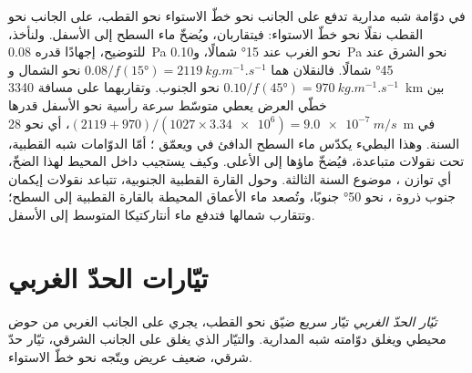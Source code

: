 في دوّامة شبه مدارية تدفع  على الجانب نحو خطّ الاستواء  نحو القطب،  على الجانب نحو القطب نقلًا نحو خطّ الاستواء: فيتقاربان، ويُضخّ ماء السطح إلى الأسفل. ولنأخذ، للتوضيح، إجهادًا قدره \qty{0.08}{Pa} نحو الغرب عند \ang{15} شمالًا، و\qty{0.10}{Pa} نحو الشرق عند \ang{45} شمالًا. فالنقلان هما $0.08/f(\ang{15}) = \qty{2119}{kg.m^{-1}.s^{-1}}$ نحو الشمال و$0.10/f(\ang{45}) =
\qty{970}{kg.m^{-1}.s^{-1}}$ نحو الجنوب. وتقاربهما على مسافة \qty{3340}{km} بين خطّي العرض يعطي متوسّط سرعة رأسية نحو الأسفل قدرها $(2119 + 970)/(1027 \times \num{3.34e6}) = \qty{9.0e-7}{m/s}$، أي نحو \qty{28}{m} في السنة. وهذا  البطيء يكدّس ماء السطح الدافئ في  ويعمّق ؛ أمّا الدوّامات شبه القطبية، تحت نقولات متباعدة، فيُضخّ ماؤها إلى الأعلى. وكيف يستجيب داخل المحيط لهذا الضخّ، أي توازن ، موضوع السنة الثالثة. وحول القارة القطبية الجنوبية، تتباعد نقولات إيكمان جنوب ذروة ، نحو \ang{50} جنوبًا، وتُصعد ماء الأعماق المحيطة بالقارة القطبية إلى السطح؛ وتتقارب شمالها فتدفع ماء أنتاركتيكا المتوسط إلى الأسفل.

\section{تيّارات الحدّ الغربي}\label{sec:b1:ocean-circulation:wbc}

\begin{definition}\label{def:b1:ocean-circulation:wbc}
\emph{تيّار الحدّ الغربي} تيّار سريع ضيّق نحو القطب، يجري على الجانب الغربي من حوض محيطي ويغلق دوّامته شبه المدارية. والتيّار الذي يغلق  على الجانب الشرقي، تيّار حدّ شرقي، ضعيف عريض ويتّجه نحو خطّ الاستواء.
\end{definition}

